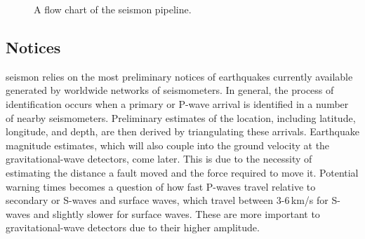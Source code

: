 \documentclass[reprint, prl, aps, showpacs]{revtex4-1}
\newcommand{\seismon}{\textnormal{seismon }}
\begin{document}
\begin{figure}[t]
 \begin{center}
 \end{center}
 \caption{A flow chart of the \seismon pipeline.}
 \label{fig:flowchart}
\end{figure}

\subsection{Notices}

\seismon relies on the most preliminary notices of earthquakes currently available generated by worldwide networks of seismometers. 
In general, the process of identification occurs when a primary or P-wave arrival is identified in a number of nearby seismometers.
Preliminary estimates of the location, including latitude, longitude, and depth, are then derived by triangulating these arrivals. 
Earthquake magnitude estimates, which will also couple into the ground velocity at the gravitational-wave detectors, come later.
This is due to the necessity of estimating the distance a fault moved and the force required to move it.
Potential warning times becomes a question of how fast P-waves travel relative to secondary or S-waves and surface waves, which travel between 3-6\,km/s for S-waves and slightly slower for surface waves. These are more important to gravitational-wave detectors due to their higher amplitude.
\end{document}
